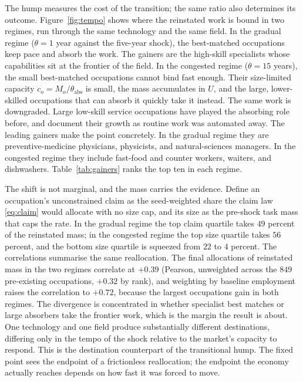 \documentclass[12pt, a4paper]{article}
\begin{document}
The hump measures the cost of the transition; the same ratio also
determines its outcome. Figure~\ref{fig:tempo} shows where the reinstated
work is bound in two regimes, run through the same technology and the
same field. In the gradual regime ($\theta = 1$ year against the five-year
shock), the best-matched occupations keep pace and absorb the work. The
gainers are the high-skill specialists whose capabilities sit at the
frontier of the field. In the congested regime ($\theta = 15$ years),
the small best-matched occupations cannot bind fast enough. Their
size-limited capacity $c_o = M_o/\theta_{\text{abs}}$ is small, the mass accumulates
in $U$, and the large, lower-skilled occupations that can absorb it
quickly take it instead. The same work is downgraded. Large low-skill
service occupations have played the absorbing role before, and
\textcite{autor2013} document their growth as routine work was
automated away. The leading gainers make the point concretely. In the
gradual regime they are preventive-medicine physicians, physicists, and
natural-sciences managers. In the congested regime they include fast-food
and counter workers, waiters, and dishwashers. Table~\ref{tab:gainers}
ranks the top ten in each regime.

The shift is not marginal, and the mass carries the evidence. Define an
occupation's unconstrained claim as the seed-weighted share the claim
law \eqref{eq:claim} would allocate with no size cap, and its size as
the pre-shock task mass that caps the rate. In the gradual regime the
top claim quartile takes $49$ percent of the reinstated mass; in the
congested regime the top size quartile takes $56$ percent, and the
bottom size quartile is squeezed from $22$ to $4$ percent. The correlations
summarise the same reallocation. The final allocations of reinstated
mass in the two regimes correlate at $+0.39$ (Pearson, unweighted
across the $849$ pre-existing occupations, $+0.32$ by rank), and
weighting by baseline employment raises the correlation to $+0.72$,
because the largest occupations gain in both regimes. The divergence is
concentrated in whether specialist best matches or large absorbers take
the frontier work, which is the margin the result is about. One
technology and one field produce substantially different destinations,
differing only in the tempo of the shock relative to the market's
capacity to respond. This is
the destination counterpart of the transitional hump. The fixed point
sees the endpoint of a frictionless reallocation; the endpoint the
economy actually reaches depends on how fast it was forced to move.
\end{document}
